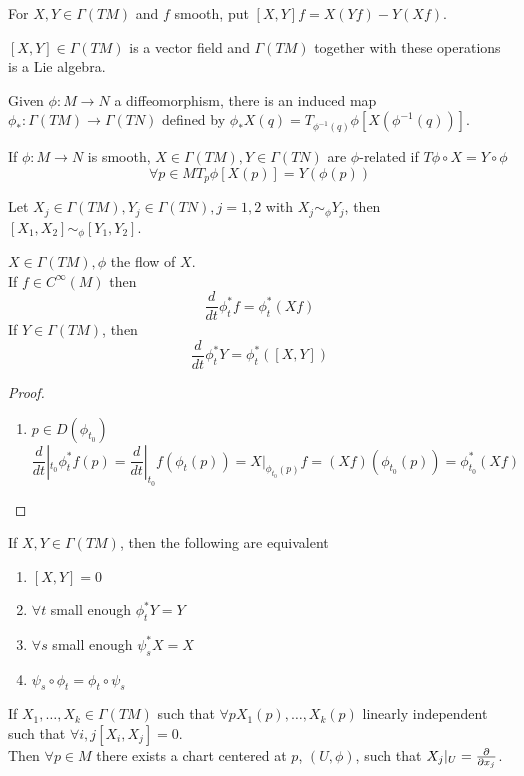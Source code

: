 \documentclass[../main.tex]{subfiles}
\begin{document}
\begin{defn}
	For $X,Y \in \Gamma( TM) $ and $f$ smooth, put $ [ X,Y] f = X( Yf) - Y( Xf) $.
\end{defn}
\begin{thm}
	$[X,Y]\in \Gamma( TM) $ is a vector field and $\Gamma( TM) $ together with these operations is a Lie algebra.
\end{thm}
Given $\phi:M\to N$ a diffeomorphism, there is an induced map $\phi_\ast:\Gamma( TM) \to\Gamma( TN) $ defined by $\phi_\ast X ( q) = T_{\phi^{-1}( q)} \phi\left[X\left( \phi^{-1}( q) \right)\right]$.\\

\begin{defn}
	If $\phi:M\to N$ is smooth, $X\in \Gamma( TM) ,Y \in \Gamma( TN) $ are $\phi$-related if $T\phi\circ X = Y\circ\phi$ 
	\[ 
	\forall p \in M T_p\phi [ X( p) ] = Y( \phi( p) ) 
	\]

\end{defn}
\begin{propo}
Let $X_j \in \Gamma( TM) , Y_j \in \Gamma( TN) ,j =1,2$ with $X_j \sim_\phi Y_j$, then $ [ X_1,X_2] \sim_\phi [ Y_1,Y_2] $.
\end{propo}
\begin{lemma}
$X\in \Gamma( TM) ,\phi$ the flow of $X$.\\
If $f\in C^{ \infty }( M) $ then 
\[ 
\frac{d}{dt}\phi_t^{\ast}f = \phi_t^{\ast}( Xf) 
\]
If $Y \in \Gamma( TM) $, then
\[ 
\frac{d}{dt}\phi_t^{\ast}Y= \phi_t^{\ast}( [ X,Y] ) 
\]

\end{lemma}
\begin{proof}
\begin{enumerate}
\item $p\in D( \phi_{t_0} ) $ 
	\[ 
		\frac{d}{dt}|_{t_0} \phi_t^{\ast} f ( p) = \frac{d}{dt}|_{t_0} f( \phi_t( p) ) 	= X|_{\phi_{t_0} ( p) } f = ( Xf) ( \phi_{t_0} ( p) ) = \phi_{t_0}^{\ast}( Xf)
	\]
	
\end{enumerate}
\end{proof}
\begin{thm}
	If $X,Y\in \Gamma( TM) $, then the following are equivalent
	\begin{enumerate}
	\item $ [ X,Y] =0$ 
	\item $\forall t  $ small enough $\phi_t^{\ast}Y = Y$ 
	\item $\forall s$ small enough $\psi_s^{\ast} X = X$ 
	\item $\psi_s \circ\phi_t = \phi_t\circ\psi_s$ 
	\end{enumerate}
\end{thm}
\begin{thm}
If $X_1,\ldots,X_k\in \Gamma( TM) $ such that $\forall p X_1( p) ,\ldots,X_k( p)  $ linearly independent such that $\forall i,j [ X_i,X_j] =0$.\\
Then $\forall p \in M$ there exists a chart centered at $p$, $( U,\phi) $, such that $X_j|_{U} = \frac{\partial}{\partial x_j}$.
\end{thm}
\end{document}
